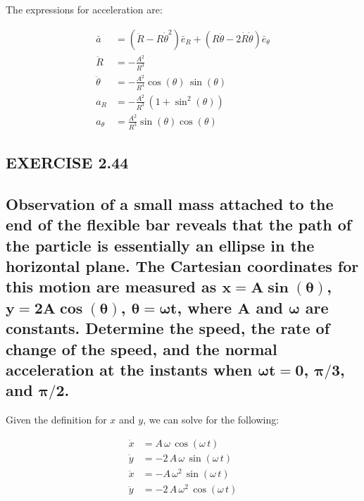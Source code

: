 \documentclass[12pt, letterpaper]{../assignment}
\begin{document}
The expressions for acceleration are:

\begin{answer}
\begin{equation*}
   \begin{aligned}
       \bar{a} &= \left( \ddot{R} - R \dot{\theta}^2 \right) \bar{e}_R +
           \left( R \ddot{\theta} - 2 \dot{R} \dot{\theta} \right) \bar{e}_\theta\\
       \ddot{R} &= -\frac{A^2}{R^3}\\
       \ddot{\theta} &= -\frac{A^2}{R^4} \cos\left(\theta \right)\,\sin\left(\theta \right)\\
       a_R &= -\frac{A^2}{R^3}\,\left(1+{\sin^2\left(\theta \right)}\right) \\
       a_\theta &= \frac{A^2}{R^3}\sin(\theta)\cos(\theta)
   \end{aligned}
\end{equation*}
\end{answer}

\subsection*{EXERCISE 2.44}

\subsection*{Observation of a small mass attached to the end of the flexible bar reveals that the path of the particle is essentially an ellipse in the horizontal plane.
The Cartesian coordinates for this motion are measured as $\bm{x = A \sin (\theta)}$, $\bm{y = 2A \cos (\theta)}$, $\bm{\theta = \omega t}$,
where $\bm{A}$ and $\bm{\omega}$ are constants.
Determine the speed, the rate of change of the speed,
and the normal acceleration at the instants when $\bm{\omega t = 0}$, $\bm{\pi/3}$, and $\bm{\pi/2}$.}

Given the definition for $x$ and $y$, we can solve for the following:

\begin{equation*}
   \begin{aligned}
       \dot{x} &= A\,\omega \,\cos\left(\omega \,t\right)\\
       \dot{y} &= -2\,A\,\omega \,\sin\left(\omega \,t\right)\\
       \ddot{x} &= -A\,\omega ^2\,\sin\left(\omega \,t\right)\\
       \ddot{y} &= -2\,A\,\omega ^2\,\cos\left(\omega \,t\right)
   \end{aligned}
\end{equation*}
\end{document}
